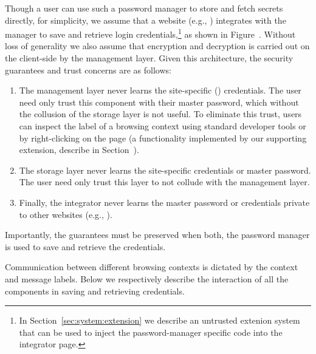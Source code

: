 %
Though a user can use such a password manager to store and fetch
secrets directly, for simplicity, we assume that a website (e.g.,
) integrates with the manager to save and retrieve login
credentials,\footnote{
  In Section~\ref{sec:system:extension} we describe an untrusted
  extenion system that can be used to inject the password-manager
  specific code into the integrator page.
} as shown in Figure~.
%
Without loss of generality we also assume that encryption and
decryption is carried out on the client-side by the management layer.
%
Given this architecture, the security guarantees and trust concerns
are as follows:
\begin{enumerate}
\item The management layer never learns the site-specific
  () credentials. The user need only trust this
  component with their master password, which without the collusion of
  the storage layer is not useful.
  To eliminate this trust, users can inspect the label of a browsing
  context using standard developer tools or by right-clicking on the
  page (a functionality implemented by our supporting extension,
  describe in Section~).
\item The storage layer never learns the site-specific credentials or
  master password. The user need only trust this layer to not collude
  with the management layer.
\item Finally, the integrator never learns the master password or
  credentials private to other websites (e.g., ).
\end{enumerate}
%
Importantly, the guarantees must be preserved when both, the
password manager is used to save and retrieve the credentials.


Communication between different browsing contexts is dictated by the
context and message labels.
%
Below we respectively describe the interaction of all the components
in saving and retrieving credentials.

